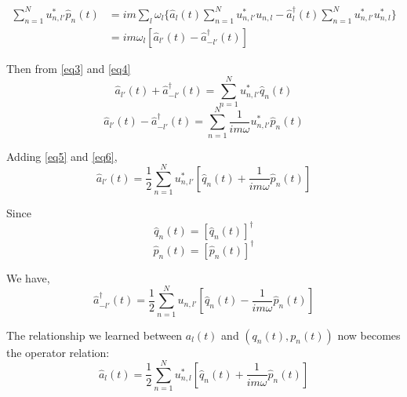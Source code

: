 \documentclass{article}
\begin{document}
\begin{align}
    \sum_{ n = 1 }^N u^*_{ n, l' } \hat{p}_n (t) &= i m \sum_l \omega_l \biggl\lbrace \hat{a}_l (t) \sum_{ n = 1 }^N u^*_{ n, l' } u_{ n, l } - \hat{a}^\dagger_l (t) \sum_{ n = 1 }^N u^*_{ n, l' } u^*_{ n, l } \biggr\rbrace \nonumber \\
    &= i m \omega_l \left[ \hat{a}_{l'} (t) - \hat{a}^\dagger_{-l'} (t)  \right] \label{eq4} %
\end{align}

Then from \eqref{eq3} and \eqref{eq4} 
\begin{equation}
    \hat{a}_{l'} (t) + \hat{a}^\dagger_{-l'} (t) = \sum_{n = 1}^N u^*_{n, l'} \hat{q}_n(t) \label{eq5}
\end{equation} 
\begin{equation}
    \hat{a}_{l'} (t) - \hat{a}^\dagger_{-l'} (t) = \sum_{n = 1}^N \frac{1}{im\omega} u^*_{n, l'} \hat{p}_n(t) \label{eq6}
\end{equation} 

Adding \eqref{eq5} and \eqref{eq6},
\begin{equation}
    \hat{a}_{l'} (t) = \frac{1}{2} \sum_{n = 1}^N u^*_{n, l'} \left [ \hat{q}_n(t) + \frac{1}{im\omega}  \hat{p}_n(t) \right ]
\end{equation}

Since
\begin{equation*}
    \hat{q}_n (t) = [\hat{q}_n (t)]^\dagger
\end{equation*}
\begin{equation*}
        \hat{p}_n (t) = [\hat{p}_n (t)]^\dagger
\end{equation*}

We have,
\begin{equation*}
    \hat{a}^\dagger_{-l'} (t) = \frac{1}{2} \sum_{n = 1}^N u_{n, l'} \left [ \hat{q}_n(t) - \frac{1}{im\omega}  \hat{p}_n(t) \right ]
\end{equation*}

The relationship we learned between $a_l (t)$ and $(q_n (t), p_n (t))$ now becomes the operator relation: 
\begin{equation*}
    \hat{a}_l (t) = \frac{1}{2} \sum_{n = 1}^N u^*_{n, l} \left [ \hat{q}_n(t) + \frac{1}{im\omega}  \hat{p}_n(t) \right ]
\end{equation*}
\end{document}
